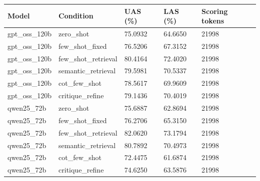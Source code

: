 \begin{tabular}{lllll}
\hline
Model & Condition & UAS (\%) & LAS (\%) & Scoring tokens \\
\hline
gpt\_oss\_120b & zero\_shot & 75.0932 & 64.6650 & 21998 \\
gpt\_oss\_120b & few\_shot\_fixed & 76.5206 & 67.3152 & 21998 \\
gpt\_oss\_120b & few\_shot\_retrieval & 80.4164 & 72.4020 & 21998 \\
gpt\_oss\_120b & semantic\_retrieval & 79.5981 & 70.5337 & 21998 \\
gpt\_oss\_120b & cot\_few\_shot & 78.5617 & 69.9609 & 21998 \\
gpt\_oss\_120b & critique\_refine & 79.1436 & 70.4019 & 21998 \\
qwen25\_72b & zero\_shot & 75.6887 & 62.8694 & 21998 \\
qwen25\_72b & few\_shot\_fixed & 76.2706 & 65.3150 & 21998 \\
qwen25\_72b & few\_shot\_retrieval & 82.0620 & 73.1794 & 21998 \\
qwen25\_72b & semantic\_retrieval & 80.7892 & 70.4973 & 21998 \\
qwen25\_72b & cot\_few\_shot & 72.4475 & 61.6874 & 21998 \\
qwen25\_72b & critique\_refine & 74.6250 & 63.5876 & 21998 \\
\hline
\end{tabular}
